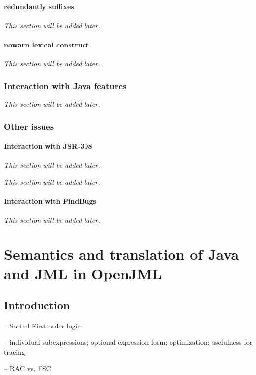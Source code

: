 \documentclass{report}%
\begin{document}
\subsection{redundantly suffixes}
\textit{This section will be added later.} %

\subsection{nowarn lexical construct}

\textit{This section will be added later.} %


\section{Interaction with Java features}

\textit{This section will be added later.} %


\section{Other issues}

\subsection{Interaction with JSR-308}
\textit{This section will be added later.} %

\textit{This section will be added later.} %


\subsection{Interaction with FindBugs}

\textit{This section will be added later.} %

\part{Semantics and translation of Java and JML in OpenJML}

\chapter{Introduction}

-- Sorted First-order-logic

-- individual subexpressions; optional expression form; optimization; usefulness for tracing

-- RAC vs. ESC
\end{document}
